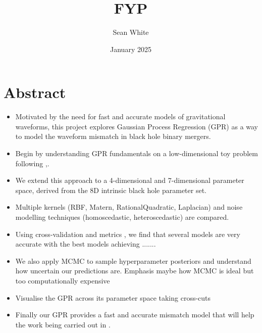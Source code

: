 \documentclass[11pt]{article}
\title{FYP }
\author{Sean White}
\date{January 2025}
\begin{document}
\maketitle


\section{Abstract}
\begin{itemize}
    \item Motivated by the need for fast and accurate models of gravitational waveforms, this project explores Gaussian Process Regression (GPR) as a way to model the waveform mismatch in black hole binary mergers.
    \item Begin by understanding GPR fundamentals on a low-dimensional toy problem following \cite{bible},.
    \item We extend this approach to a 4-dimensional and 7-dimensional parameter space, derived from the 8D intrinsic black hole parameter set.
    \item Multiple kernels (RBF, Matern, RationalQuadratic, Laplacian) and noise modelling techniques (homoscedastic, heteroscedastic) are compared.
    \item Using cross-validation and metrics \cite{metrics}, we find that several models are very accurate with the best models achieving .......
    \item We also apply MCMC to sample hyperparameter posteriors and understand how uncertain our predictions are. Emphasis maybe how MCMC is ideal but too computationally expensive 
    \item Visualise the GPR across its parameter space taking cross-cuts
    \item Finally our GPR provides a fast and accurate mismatch model that will help the work being carried out in \cite{Ogpaper}.
\end{itemize}
\end{document}

